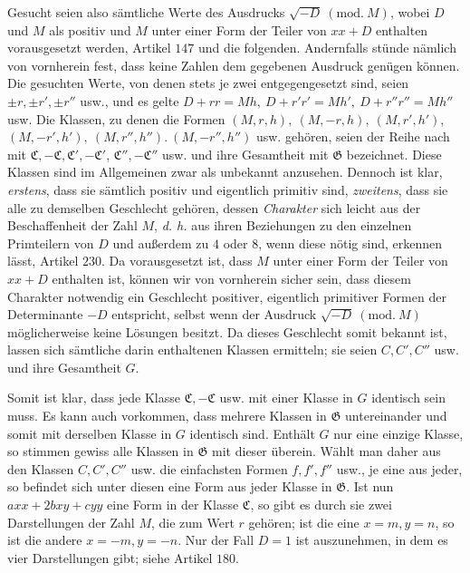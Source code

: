 Gesucht seien also sämtliche Werte des Ausdrucks \(\surd{-D}\ (\mathrm{mod.}\ M)\), wobei \(D\) und \(M\) als positiv und \(M\) unter einer Form der Teiler von \(xx+D\) enthalten vorausgesetzt werden, Artikel \(147\) und die folgenden. Andernfalls stünde nämlich von vornherein fest, dass keine Zahlen dem gegebenen Ausdruck genügen können. Die gesuchten Werte, von denen stets je zwei entgegengesetzt sind, seien \(\pm r,\allowbreak \pm r',\allowbreak \pm r''\) usw., und es gelte \(D+rr=Mh,\allowbreak \ D+r'r'=Mh',\allowbreak \ D+r''r''=Mh''\) usw. Die Klassen, zu denen die Formen \((M,\allowbreak r,\allowbreak h),\allowbreak \ (M,\allowbreak -r,\allowbreak h),\allowbreak \ (M,\allowbreak r',\allowbreak h')\), \((M,\allowbreak -r',\allowbreak h'),\allowbreak \ (M,\allowbreak r'',\allowbreak h'').\ (M,\allowbreak -r'',\allowbreak h'')\) usw. gehören, seien der Reihe nach mit \(\mathfrak C,\allowbreak -\mathfrak C,\allowbreak \mathfrak C',\allowbreak -\mathfrak C'\), \(\mathfrak C'',\allowbreak -\mathfrak C''\) usw. und ihre Gesamtheit mit \(\mathfrak G\) bezeichnet. Diese Klassen sind im Allgemeinen zwar als unbekannt anzusehen. Dennoch ist klar, \textit{erstens}, dass sie sämtlich positiv und eigentlich primitiv sind, \textit{zweitens}, dass sie alle zu demselben Geschlecht gehören, dessen \textit{Charakter} sich leicht aus der Beschaffenheit der Zahl \(M\), \textit{d. h.} aus ihren Beziehungen zu den einzelnen Primteilern von \(D\) und außerdem zu \(4\) oder \(8\), wenn diese nötig sind, erkennen lässt, Artikel \(230\). Da vorausgesetzt ist, dass \(M\) unter einer Form der Teiler von \(xx+D\) enthalten ist, können wir von vornherein sicher sein, dass diesem Charakter notwendig ein Geschlecht positiver, eigentlich primitiver Formen der Determinante \(-D\) entspricht, selbst wenn der Ausdruck \(\surd{-D}\ (\mathrm{mod.}\ M)\) möglicherweise keine Lösungen besitzt. Da dieses Geschlecht somit bekannt ist, lassen sich sämtliche darin enthaltenen Klassen ermitteln; sie seien \(C,\allowbreak C',\allowbreak C''\) usw. und ihre Gesamtheit \(G\).

Somit ist klar, dass jede Klasse \(\mathfrak C,\allowbreak -\mathfrak C\) usw. mit einer Klasse in \(G\) identisch sein muss. Es kann auch vorkommen, dass mehrere Klassen in \(\mathfrak G\) untereinander und somit mit derselben Klasse in \(G\) identisch sind. Enthält \(G\) nur eine einzige Klasse, so stimmen gewiss alle Klassen in \(\mathfrak G\) mit dieser überein. Wählt man daher aus den Klassen \(C,\allowbreak C',\allowbreak C''\) usw. die einfachsten Formen \(f,\allowbreak f',\allowbreak f''\) usw., je eine aus jeder, so befindet sich unter diesen eine Form aus jeder Klasse in \(\mathfrak G\). Ist nun \(axx+2bxy+cyy\) eine Form in der Klasse \(\mathfrak C\), so gibt es durch sie zwei Darstellungen der Zahl \(M\), die zum Wert \(r\) gehören; ist die eine \(x=m,\allowbreak y=n\), so ist die andere \(x=-m,\allowbreak y=-n\). Nur der Fall \(D=1\) ist auszunehmen, in dem es vier Darstellungen gibt; siehe Artikel \(180\).

